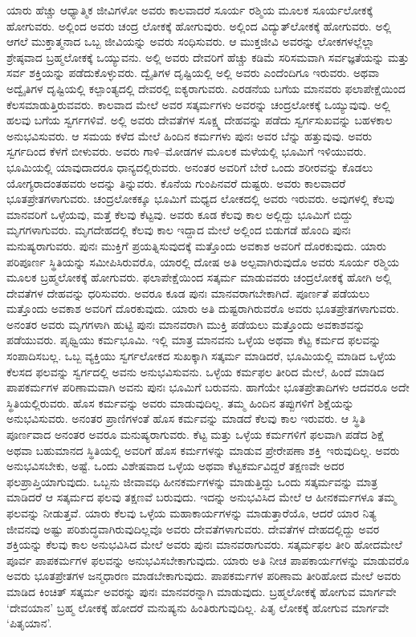 \vskip 0.2cm

ಯಾರು ಹೆಚ್ಚು ಆಧ್ಯಾತ್ಮಿಕ ಜೀವಿಗಳೋ ಅವರು ಕಾಲವಾದರೆ ಸೂರ್ಯ ರಶ್ಮಿಯ ಮೂಲಕ ಸೂರ್ಯಲೋಕಕ್ಕೆ ಹೋಗುವರು. ಅಲ್ಲಿಂದ ಅವರು ಚಂದ್ರ ಲೋಕಕ್ಕೆ ಹೋಗುವುರು. ಅಲ್ಲಿಂದ ವಿದ್ಯುತ್​ಲೋಕಕ್ಕೆ ಹೋಗುವರು. ಅಲ್ಲಿ ಆಗಲೆ ಮುಕ್ತಾತ್ಮನಾದ ಒಬ್ಬ ಜೀವಿಯನ್ನು ಅವರು ಸಂಧಿಸುವರು. ಆ ಮುಕ್ತಜೀವಿ ಅವರನ್ನು ಲೋಕಗಳಲ್ಲೆಲ್ಲಾ ಶ್ರೇಷ್ಠವಾದ ಬ್ರಹ್ಮಲೋಕಕ್ಕೆ ಒಯ್ಯುವನು. ಅಲ್ಲಿ ಅವರು ದೇವರಿಗೆ ಹೆಚ್ಚು ಕಡಿಮೆ ಸರಿಸಮವಾಗಿ ಸರ್ವಜ್ಞತೆಯನ್ನು ಮತ್ತು ಸರ್ವ ಶಕ್ತಿಯನ್ನು ಪಡೆದುಕೊಳ್ಳುವರು. ದ್ವೈತಿಗಳ ದೃಷ್ಟಿಯಲ್ಲಿ ಅಲ್ಲಿ ಅವರು ಎಂದೆಂದಿಗೂ ಇರುವರು. ಅಥವಾ ಅದ್ವೈತಿಗಳ ದೃಷ್ಟಿಯಲ್ಲಿ ಕಲ್ಪಾಂತ್ಯದಲ್ಲಿ ದೇವರಲ್ಲಿ ಐಕ್ಯರಾಗುವರು. ಎರಡನೆಯ ಬಗೆಯ ಮಾನವರು ಫಲಾಪೇಕ್ಷೆಯಿಂದ ಕೆಲಸಮಾಡುತ್ತಿರುವವರು. ಕಾಲವಾದ ಮೇಲೆ ಅವರ ಸತ್ಕರ್ಮಗಳು ಅವರನ್ನು ಚಂದ್ರಲೋಕಕ್ಕೆ ಒಯ್ಯುವುವು. ಅಲ್ಲಿ ಹಲವು ಬಗೆಯ ಸ್ವರ್ಗಗಳಿವೆ. ಅಲ್ಲಿ ಅವರು ದೇವತೆಗಳ ಸೂಕ್ಷ್ಮ ದೇಹವನ್ನು ಪಡೆದು ಸ್ವರ್ಗಸುಖವನ್ನು ಬಹಳಕಾಲ ಅನುಭವಿಸುವರು. ಆ ಸಮಯ ಕಳೆದ ಮೇಲೆ ಹಿಂದಿನ ಕರ್ಮಗಳು ಪುನಃ ಅವರ ಬೆನ್ನು ಹತ್ತುವುವು. ಅವರು ಸ್ವರ್ಗದಿಂದ ಕೆಳಗೆ ಬೀಳುವರು. ಅವರು ಗಾಳಿ–ಮೋಡಗಳ ಮೂಲಕ ಮಳೆಯಲ್ಲಿ ಭೂಮಿಗೆ ಇಳಿಯುವರು. ಭೂಮಿಯಲ್ಲಿ ಯಾವುದಾದರೂ ಧಾನ್ಯದಲ್ಲಿರುವರು. ಅನಂತರ ಅವರಿಗೆ ಬೇರೆ ಒಂದು ಶರೀರವನ್ನು ಕೊಡಲು ಯೋಗ್ಯರಾದಂತಹವರು ಅದನ್ನು ತಿನ್ನುವರು. ಕೊನೆಯ ಗುಂಪಿನವರೆ ದುಷ್ಟರು. ಅವರು ಕಾಲವಾದರೆ ಭೂತಪ್ರೇತಗಳಾಗುವರು. ಚಂದ್ರಲೋಕಕ್ಕೂ ಭೂಮಿಗೆ ಮಧ್ಯದ ಲೋಕದಲ್ಲಿ ಅವರು ಇರುವರು. ಅವುಗಳಲ್ಲಿ ಕೆಲವು ಮಾನವರಿಗೆ ಒಳ್ಳೆಯವು, ಮತ್ತೆ ಕೆಲವು ಕೆಟ್ಟವು. ಅವರು ಕೂಡ ಕೆಲವು ಕಾಲ ಅಲ್ಲಿದ್ದು ಭೂಮಿಗೆ ಬಿದ್ದು ಮೃಗಗಳಾಗುವರು. ಮೃಗದೇಹದಲ್ಲಿ ಕೆಲವು ಕಾಲ ಇದ್ದಾದ ಮೇಲೆ ಅಲ್ಲಿಂದ ಬಿಡುಗಡೆ ಹೊಂದಿ ಪುನಃ ಮನುಷ್ಯರಾಗುವರು. ಪುನಃ ಮುಕ್ತಿಗೆ ಪ್ರಯತ್ನಿಸುವುದಕ್ಕೆ ಮತ್ತೊಂದು ಅವಕಾಶ ಅವರಿಗೆ ದೊರಕುವುದು. ಯಾರು ಪರಿಪೂರ್ಣ ಸ್ಥಿತಿಯನ್ನು ಸಮೀಪಿಸಿರುವರೊ, ಯಾರಲ್ಲಿ ದೋಷ ಅತಿ ಅಲ್ಪವಾಗಿರುವುದೊ ಅವರು ಸೂರ್ಯ ರಶ್ಮಿಯ ಮೂಲಕ ಬ್ರಹ್ಮಲೋಕಕ್ಕೆ ಹೋಗುವರು. ಫಲಾಪೇಕ್ಷೆಯಿಂದ ಸತ್ಕರ್ಮ ಮಾಡುವವರು ಚಂದ್ರಲೋಕಕ್ಕೆ ಹೋಗಿ ಅಲ್ಲಿ ದೇವತೆಗಳ ದೇಹವನ್ನು ಧರಿಸುವರು. ಅವರೂ ಕೂಡ ಪುನಃ ಮಾನವರಾಗಬೇಕಾಗಿದೆ. ಪೂರ್ಣತೆ ಪಡೆಯಲು ಮತ್ತೊಂದು ಅವಕಾಶ ಅವರಿಗೆ ದೊರಕುವುದು. ಯಾರು ಅತಿ ದುಷ್ಟರಾಗಿರುವರೊ ಅವರು ಭೂತಪ್ರೇತಗಳಾಗುವರು. ಅನಂತರ ಅವರು ಮೃಗಗಳಾಗಿ ಹುಟ್ಟಿ ಪುನಃ ಮಾನವರಾಗಿ ಮುಕ್ತಿ ಪಡೆಯಲು ಮತ್ತೊಂದು ಅವಕಾಶವನ್ನು ಪಡೆಯುವರು. ಪೃಥ್ವಿಯು ಕರ್ಮಭೂಮಿ. ಇಲ್ಲಿ ಮಾತ್ರ ಮಾನವನು ಒಳ್ಳೆಯ ಅಥವಾ ಕೆಟ್ಟ ಕರ್ಮದ ಫಲವನ್ನು ಸಂಪಾದಿಸಬಲ್ಲ. ಒಬ್ಬ ವ್ಯಕ್ತಿಯು ಸ್ವರ್ಗಲೋಕದ ಸುಖಕ್ಕಾಗಿ ಸತ್ಕರ್ಮ ಮಾಡಿದರೆ, ಭೂಮಿಯಲ್ಲಿ ಮಾಡಿದ ಒಳ್ಳೆಯ ಕೆಲಸದ ಫಲವನ್ನು ಸ್ವರ್ಗದಲ್ಲಿ ಅವನು ಅನುಭವಿಸುವನು. ಒಳ್ಳೆಯ ಕರ್ಮಫಲ ತೀರಿದ ಮೇಲೆ, ಹಿಂದೆ ಮಾಡಿದ ಪಾಪಕರ್ಮಗಳ ಪರಿಣಾಮವಾಗಿ ಅವನು ಪುನಃ ಭೂಮಿಗೆ ಬರುವನು. ಹಾಗೆಯೇ ಭೂತಪ್ರೇತಾದಿಗಳು ಆದವರೂ ಅದೇ ಸ್ಥಿತಿಯಲ್ಲಿರುವರು. ಹೊಸ ಕರ್ಮವನ್ನು ಅವರು ಮಾಡುವುದಿಲ್ಲ. ತಮ್ಮ ಹಿಂದಿನ ತಪ್ಪುಗಳಿಗೆ ಶಿಕ್ಷೆಯನ್ನು ಅನುಭವಿಸುವರು. ಅನಂತರ ಪ್ರಾಣಿಗಳಂತೆ ಹೊಸ ಕರ್ಮವನ್ನು ಮಾಡದೆ ಕೆಲವು ಕಾಲ ಇರುವರು. ಆ ಸ್ಥಿತಿ ಪೂರ್ಣವಾದ ಅನಂತರ ಅವರೂ ಮನುಷ್ಯರಾಗುವರು. ಕೆಟ್ಟ ಮತ್ತು ಒಳ್ಳೆಯ ಕರ್ಮಗಳಿಗೆ ಫಲವಾಗಿ ಪಡೆದ ಶಿಕ್ಷೆ ಅಥವಾ ಬಹುಮಾನದ ಸ್ಥಿತಿಯಲ್ಲಿ ಅವರಿಗೆ ಹೊಸ ಕರ್ಮಗಳನ್ನು ಮಾಡುವ ಪ್ರೇರೇಪಣಾ ಶಕ್ತಿ\break\ ಇರುವುದಿಲ್ಲ. ಅವರು ಅನುಭವಿಸಬೇಕು, ಅಷ್ಟೆ. ಒಂದು ವಿಶೇಷವಾದ ಒಳ್ಳೆಯ ಅಥವಾ ಕೆಟ್ಟಕರ್ಮವಿದ್ದರೆ ತಕ್ಷಣವೇ ಅದರ ಫಲಪ್ರಾಪ್ತಿಯಾಗುವುದು. ಒಬ್ಬನು ಜೀವಾವಧಿ ಹೀನಕರ್ಮಗಳನ್ನು ಮಾಡುತ್ತಿದ್ದು ಒಂದು ಸತ್ಕರ್ಮವನ್ನು ಮಾತ್ರ ಮಾಡಿದರೆ ಆ ಸತ್ಕರ್ಮದ ಫಲವು ತಕ್ಷಣವೆ ಬರುವುದು. ಇದನ್ನು ಅನುಭವಿಸಿದ ಮೇಲೆ ಆ ಹೀನಕರ್ಮಗಳೂ ತಮ್ಮ ಫಲವನ್ನು ನೀಡುತ್ತವೆ. ಯಾರು ಕೆಲವು ಒಳ್ಳೆಯ ಮಹಾಕಾರ್ಯಗಳನ್ನು ಮಾಡುತ್ತಾರೆಯೊ, ಆದರೆ ಯಾರ ನಿತ್ಯ ಜೀವನವು ಅಷ್ಟು ಪರಿಶುದ್ಧವಾಗಿರುವುದಿಲ್ಲವೊ ಅವರು ದೇವತೆಗಳಾಗುವರು. ದೇವತೆಗಳ ದೇಹದಲ್ಲಿದ್ದು ಅವರ ಶಕ್ತಿಯನ್ನು ಕೆಲವು ಕಾಲ ಅನುಭವಿಸಿದ ಮೇಲೆ ಅವರು ಪುನಃ ಮಾನವರಾಗುವರು. ಸತ್ಕರ್ಮಫಲ ತೀರಿ ಹೋದಮೇಲೆ ಪೂರ್ವ ಪಾಪಕರ್ಮಗಳ ಫಲವನ್ನು ಅನುಭವಿಸಬೇಕಾಗುವುದು. ಯಾರು ಅತಿ ನೀಚ ಪಾಪಕಾರ್ಯಗಳನ್ನು ಮಾಡುವರೊ ಅವರು ಭೂತಪ್ರೇತಗಳ ಜನ್ಮಧಾರಣ ಮಾಡಬೇಕಾಗುವುದು. ಪಾಪಕರ್ಮಗಳ ಪರಿಣಾಮ ತೀರಿಹೋದ ಮೇಲೆ ಅವರು ಮಾಡಿದ ಕಿಂಚಿತ್​ ಸತ್ಕರ್ಮ ಅವರನ್ನು ಪುನಃ ಮಾನವರನ್ನಾಗಿ ಮಾಡುವುದು. ಬ್ರಹ್ಮಲೋಕಕ್ಕೆ ಹೋಗುವ ಮಾರ್ಗವೇ ‘ದೇವಯಾನ’ ಬ್ರಹ್ಮ ಲೋಕಕ್ಕೆ ಹೋದರೆ ಮನುಷ್ಯನು ಹಿಂತಿರುಗುವುದಿಲ್ಲ. ಪಿತೃ ಲೋಕಕ್ಕೆ ಹೋಗುವ ಮಾರ್ಗವೇ ‘ಪಿತೃಯಾನ’.

